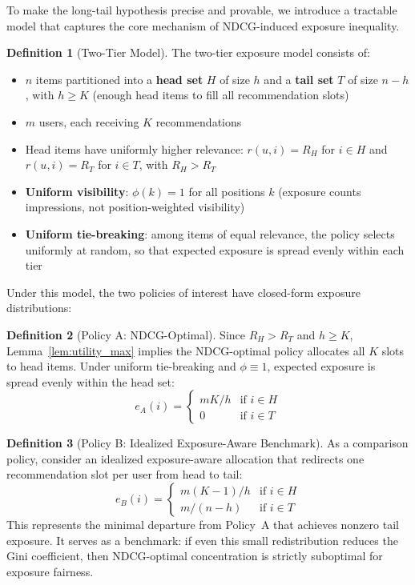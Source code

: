 \documentclass[11pt,a4paper]{article}
\theoremstyle{definition}
\newtheorem{definition}{Definition}[section]
\theoremstyle{plain}
\theoremstyle{remark}
\begin{document}
To make the long-tail hypothesis precise and provable, we introduce a tractable model that captures the core mechanism of NDCG-induced exposure inequality.

\begin{definition}[Two-Tier Model]
\label{def:two_tier}
The two-tier exposure model consists of:
\begin{itemize}
    \item $n$ items partitioned into a \textbf{head set} $H$ of size $h$ and a \textbf{tail set} $T$ of size $n - h$, with $h \geq K$ (enough head items to fill all recommendation slots)
    \item $m$ users, each receiving $K$ recommendations
    \item Head items have uniformly higher relevance: $r(u, i) = R_H$ for $i \in H$ and $r(u, i) = R_T$ for $i \in T$, with $R_H > R_T$
    \item \textbf{Uniform visibility}: $\phi(k) = 1$ for all positions $k$ (exposure counts impressions, not position-weighted visibility)
    \item \textbf{Uniform tie-breaking}: among items of equal relevance, the policy selects uniformly at random, so that expected exposure is spread evenly within each tier
\end{itemize}
\end{definition}

Under this model, the two policies of interest have closed-form exposure distributions:

\begin{definition}[Policy A: NDCG-Optimal]
\label{def:policyA}
Since $R_H > R_T$ and $h \geq K$, Lemma~\ref{lem:utility_max} implies the NDCG-optimal policy allocates all $K$ slots to head items. Under uniform tie-breaking and $\phi \equiv 1$, expected exposure is spread evenly within the head set:
\begin{equation}
    e_A(i) = \begin{cases} mK / h & \text{if } i \in H \\ 0 & \text{if } i \in T \end{cases}
\end{equation}
\end{definition}

\begin{definition}[Policy B: Idealized Exposure-Aware Benchmark]
\label{def:policyB}
As a comparison policy, consider an idealized exposure-aware allocation that redirects one recommendation slot per user from head to tail:
\begin{equation}
    e_B(i) = \begin{cases} m(K-1) / h & \text{if } i \in H \\ m / (n - h) & \text{if } i \in T \end{cases}
\end{equation}
This represents the minimal departure from Policy~A that achieves nonzero tail exposure. It serves as a benchmark: if even this small redistribution reduces the Gini coefficient, then NDCG-optimal concentration is strictly suboptimal for exposure fairness.
\end{definition}
\end{document}
